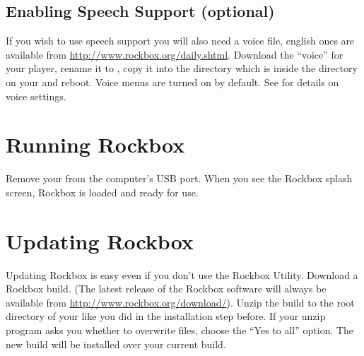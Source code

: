 \subsection{Enabling Speech Support (optional)}\label{sec:enabling_speech_support}
If you wish to use speech support you will also need a voice file, english ones
are available from \url{http://www.rockbox.org/daily.shtml}. Download the
``voice'' for your player, rename it to , copy it
into the  directory which is inside the  directory on
your \dap{} and reboot. Voice menus are turned on by default. See
 for details on voice settings.

\section{Running Rockbox}
Remove your \dap{} from the computer's USB port. %
%
%
When you see the Rockbox splash screen, Rockbox is loaded and ready for
use.


\section{Updating Rockbox}
Updating Rockbox is easy even if you don't use the Rockbox Utility.
Download a Rockbox build.
(The latest release of the Rockbox software will always be available from
\url{http://www.rockbox.org/download/}). Unzip the build to the root directory
of your \dap{} like you did in the installation step before. If your unzip
program asks you whether to overwrite files, choose the ``Yes to all'' option.
The new build will be installed over your current build.

